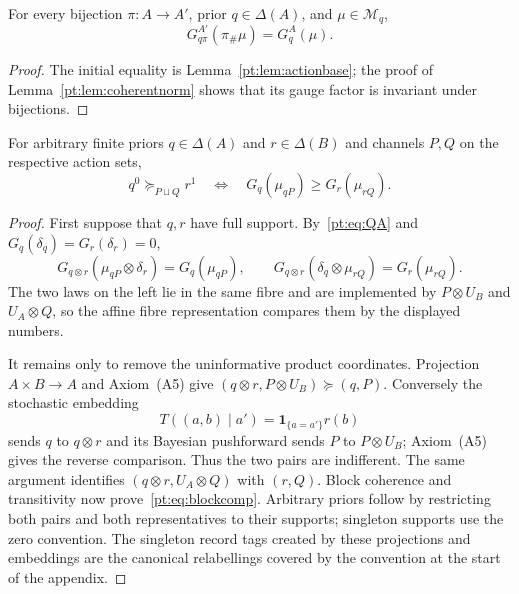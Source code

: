 \begin{corollary}
\label{pt:cor:permutationinvariance}
For every bijection $\pi:A\to A'$, prior $q\in\Delta(A)$, and
$\mu\in\mathcal M_q$,
\[
 G_{q\pi}^{A'}(\pi_\#\mu)=G_q^A(\mu).
\]
\end{corollary}

\begin{proof}
The initial equality is Lemma~\ref{pt:lem:actionbase}; the proof of
Lemma~\ref{pt:lem:coherentnorm} shows that its gauge factor is invariant under
bijections.
\end{proof}

\begin{lemma}
\label{pt:lem:blockbridge}
For arbitrary finite priors $q\in\Delta(A)$ and $r\in\Delta(B)$ and channels
$P,Q$ on the respective action sets,
\begin{equation}
 q^0\succeq_{P\sqcup Q}r^1
 \quad\Longleftrightarrow\quad
 G_q(\mu_{qP})\ge G_r(\mu_{rQ}).
\tag{BC}\label{pt:eq:blockcomp}
\end{equation}
\end{lemma}

\begin{proof}
First suppose that $q,r$ have full support.  By~\eqref{pt:eq:QA} and
$G_q(\delta_q)=G_r(\delta_r)=0$,
\[
 G_{q\otimes r}(\mu_{qP}\otimes\delta_r)=G_q(\mu_{qP}),
 \qquad
 G_{q\otimes r}(\delta_q\otimes\mu_{rQ})=G_r(\mu_{rQ}).
\]
The two laws on the left lie in the same fibre and are implemented by
$P\otimes U_B$ and $U_A\otimes Q$, so the affine fibre representation
compares them by the displayed numbers.

It remains only to remove the uninformative product coordinates.  Projection
$A\times B\to A$ and Axiom~\textup{(A5)} give
$(q\otimes r,P\otimes U_B)\succeq(q,P)$.  Conversely the stochastic
embedding
\[
 T((a,b)\mid a')=\mathbf 1_{\{a=a'\}}r(b)
\]
sends $q$ to $q\otimes r$ and its Bayesian pushforward sends $P$ to
$P\otimes U_B$; Axiom~\textup{(A5)} gives the reverse comparison.  Thus the
two pairs are indifferent.  The same argument identifies
$(q\otimes r,U_A\otimes Q)$ with $(r,Q)$.  Block coherence and transitivity
now prove~\eqref{pt:eq:blockcomp}.  Arbitrary priors follow by restricting
both pairs and both representatives to their supports; singleton supports use
the zero convention.  The singleton record tags created by these projections
and embeddings are the canonical relabellings covered by the convention at
the start of the appendix.
\end{proof}

